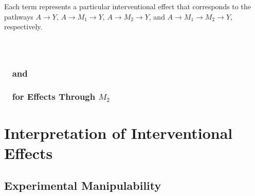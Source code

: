 Each term represents a particular interventional effect that corresponds to the pathways 
$A \rightarrow Y$, $A \rightarrow M_{1} \rightarrow Y$, $A \rightarrow M_{2} \rightarrow Y$, 
and $A \rightarrow M_{1} \rightarrow M_{2} \rightarrow Y$, respectively. 

\subsubsection{~\cite{vansteelandtdaniel2017}}

\subsubsection{~\cite{vanderweelerobinson2014} and~\cite{jacksonvanderweele2018}}

\subsubsection{~\cite{vanderweeleetal2014} for Effects Through $M_{2}$}

\section{Interpretation of Interventional Effects}\label{subsection:interpretation}

\subsection{Experimental Manipulability}






